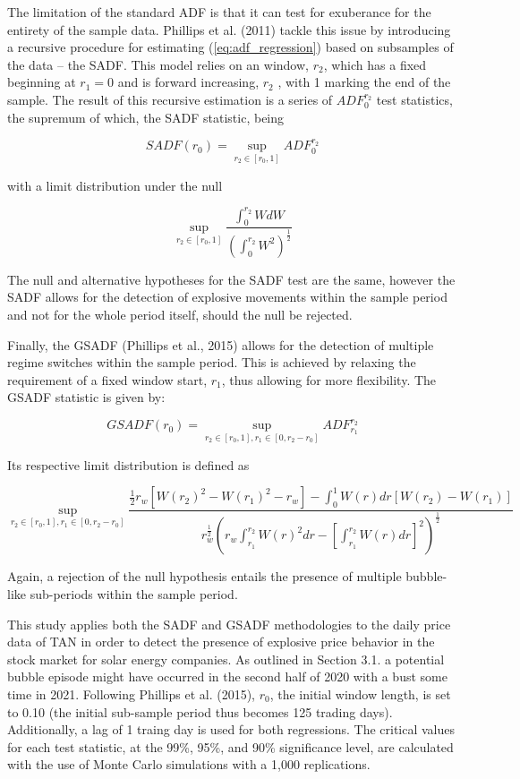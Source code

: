\documentclass[11pt]{article}
\begin{document}
The limitation of the standard ADF is that it can test for exuberance for the entirety of the sample data. Phillips et al. (2011) tackle this issue by introducing a recursive procedure for estimating (\ref{eq:adf_regression}) based on subsamples of the data -- the SADF. This model relies on an window, $r_2$, which has a fixed beginning at $r_1 = 0$ and is forward increasing, $r_2$ \in [$r_1$, 1], with 1 marking the end of the sample. The result of this recursive estimation is a series of $ADF_0^{r_2}$ test statistics, the supremum of which, the SADF statistic, being 

$$ SADF(r_0) = \sup_{r_2 \in [r_0, 1]} ADF_0^{r_2} $$

with a limit distribution under the null

$$ \sup_{r_2 \in [r_0, 1]} \frac{\int_0^{r_2} WdW}{(\int_0^{r_2} W^2)^\frac{1}{2}} $$

\newline
The null and alternative hypotheses for the SADF test are the same, however the SADF allows for the detection of explosive movements within the sample period and not for the whole period itself, should the null be rejected.
\newline

Finally, the GSADF (Phillips et al., 2015) allows for the detection of multiple regime switches within the sample period. This is achieved by relaxing the requirement of a fixed window start, $r_1$, thus allowing for more flexibility. The GSADF statistic is given by:

$$ GSADF(r_0) = \sup_{r_2 \in [r_0, 1], r_1 \in [0, r_2 - r_0]} ADF_{r_1}^{r_2} $$

Its respective limit distribution is defined as

$$  \sup_{r_2 \in [r_0, 1], r_1 \in [0, r_2 - r_0]} \frac{\frac{1}{2} r_w [W(r_2)^2 - W(r_1)^2 - r_w] - \int_0^1 W(r)dr[W(r_2) - W(r_1)]}{r_w^{\frac{1}{2}}(r_w\int_{r_1}^{r_2} W(r)^2dr - [\int_{r_1}^{r_2}W(r)dr]^2)^\frac{1}{2}} $$

Again, a rejection of the null hypothesis entails the presence of multiple bubble-like sub-periods within the sample period.
\newline

This study applies both the SADF and GSADF methodologies to the daily price data of TAN in order to detect the presence of explosive price behavior in the stock market for solar energy companies. As outlined in Section 3.1. a potential bubble episode might have occurred in the second half of 2020 with a bust some time in 2021. Following Phillips et al. (2015), $r_0$, the initial window length, is set to 0.10 (the initial sub-sample period thus becomes 125 trading days). Additionally, a lag of 1 traing day is used for both regressions. The critical values for each test statistic, at the 99\%, 95\%, and 90\% significance level, are calculated with the use of Monte Carlo simulations with a 1,000 replications.    
\end{document}
